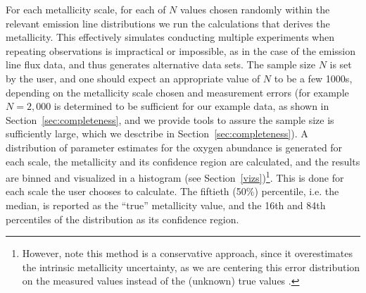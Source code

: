 \documentclass{emulateapj}
\begin{document}
For each metallicity scale, for each of $N$  values chosen randomly within the relevant emission line distributions we run the calculations that derives the metallicity.
This effectively simulates conducting multiple experiments when repeating observations is impractical or impossible, as in the case of the emission line flux data, and thus generates alternative data sets. 
The sample size $N$ is set by the user, and one should expect an appropriate value of $N$ to be a few 1000s, depending on the metallicity scale chosen and measurement errors (for example  $N=2,000$ is determined to be sufficient for our example data, as shown in Section~\ref{sec:completeness}, and we provide tools to assure the sample size is sufficiently large, which we desctribe in Section~\ref{sec:completeness}). 
A distribution of parameter estimates for the oxygen abundance is generated for each scale, the metallicity and its confidence region are calculated,
and the results are binned and visualized in a histogram (see Section~\ref{vizs})\footnote{However, note this method is a conservative approach, since it overestimates the intrinsic metallicity uncertainty, as we are centering this error distribution on the measured values instead of the (unknown) true values \citep{andrae10}.
}. This is done for each scale the user chooses to calculate. The fiftieth (50\%) percentile, i.e.  the median, is reported as the ``true'' metallicity value, and the 16th and 84th percentiles of the distribution as its confidence region. %
\end{document}
